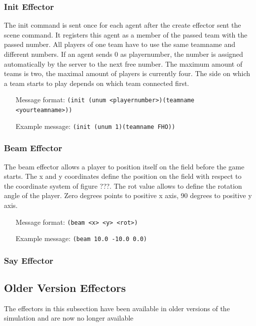 \subsubsection{Init Effector}
The init command is sent once for each agent after the create effector sent the
scene command. It registers this agent as a member of the passed team with the passed number.
All players of one team have to use the same teamname and different numbers.
If an agent sends 0 as playernumber, the number is assigned automatically by
the server to the next free number. The maximum amount of teams is two, the
maximal amount of players is currently four.
The side on which a team starts to play depends on which team connected
first.
\begin{itemize}
	\item[Message format:] \texttt{(init (unum <playernumber>)(teamname
	<yourteamname>))}
	\item[Example message:] \texttt{(init (unum 1)(teamname FHO))}
\end{itemize}

\subsubsection{Beam Effector}
The beam effector allows a player to position itself on the field before the
game starts. The x and y coordinates define the position on the field with
respect to the coordinate system of figure ???. The rot value allows to define
the rotation angle of the player. Zero degrees points to positive x axis, 90
degrees to positive y axis.
\begin{itemize}
	\item[Message format:] \texttt{(beam <x> <y> <rot>)}
	\item[Example message:] \texttt{(beam 10.0 -10.0 0.0)}
\end{itemize}

\subsubsection{Say Effector}

\subsection{Older Version Effectors}
The effectors in this subsection have been available in older versions of the
simulation and are now no longer available

